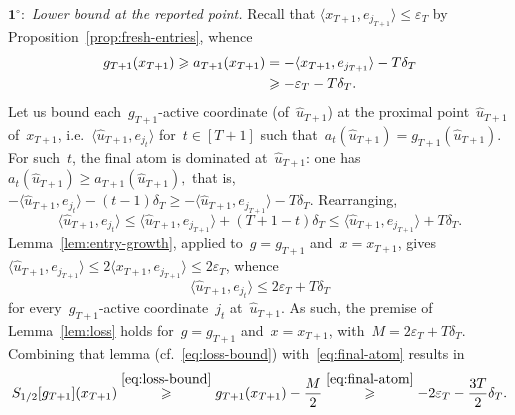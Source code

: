 \documentclass[11pt]{article}
\numberwithin{equation}{section}
\let\le\leqslant
\let\ge\geqslant
\theoremstyle{remark}
\newcommand{\proofstep}[1]{$\textbf{#1}^{\circ}$}
\newcommand{\veps}{\varepsilon}
\newcommand{\Env}{S}
\newcommand{\1}{\mathbf{1}}
\begin{document}
\proofstep{1}:~{\em Lower bound at the reported point.} 
Recall that
$
\langle x_{T+1}, e_{j_{T+1}} \rangle \le \veps_T
$
by Proposition~\ref{prop:fresh-entries}, whence 
\begin{align}
\label{eq:final-atom}
	g_{T+1}(x_{T+1})
	\ge a_{T+1}(x_{T+1})
	&= 
	-\langle x_{T+1}, e_{j_{T+1}} \rangle - T\delta_T \notag\\
	&\ge
	-\veps_T - T\delta_T.
\end{align}
Let us bound each~$g_{T+1}$-{active coordinate} (of~$\hat u_{T+1}$) at the proximal point~$\hat u_{T+1}$ of~$x_{T+1}$, i.e.~$\langle \hat u_{T+1}, e_{j_t} \rangle$ for~$t \in [T+1]$ such that~$a_t(\hat u_{T+1}) = g_{T+1}(\hat u_{T+1})$. 
For such~$t$, the final atom is dominated at~$\hat u_{T+1}$: one has
$
a_t(\hat u_{T+1}) \ge a_{T+1}(\hat u_{T+1}),
$
that is,~$- \langle \hat u_{T+1}, e_{j_t} \rangle -(t-1)\delta_T \ge -\langle \hat u_{T+1}, e_{j_{T+1}} \rangle -T\delta_T$. 
Rearranging,
\begin{equation*}
        \langle \hat u_{T+1}, e_{j_t} \rangle 
        \le \langle \hat u_{T+1}, e_{j_{T+1}} \rangle + (T+1-t)\delta_T 
        \le \langle \hat u_{T+1}, e_{j_{T+1}} \rangle + T\delta_T.
\end{equation*}
Lemma~\ref{lem:entry-growth}, applied to~$g = g_{T+1}$ and~$x = x_{T+1}$, gives~$\langle \hat u_{T+1}, e_{j_{T+1}} \rangle \le 2 \langle x_{T+1}, e_{j_{T+1}} \rangle \le 2\veps_T$, whence
\begin{equation*}
        \langle \hat u_{T+1}, e_{j_t} \rangle  \le 2\veps_T + T\delta_T
\end{equation*}
for every~$g_{T+1}$-active coordinate~$j_t$ at~$\hat u_{T+1}$. 
As such, the premise of Lemma~\ref{lem:loss} holds for~$g = g_{T+1}$ and~$x = x_{T+1}$, with~$M = 2\veps_T + T\delta_T$.
Combining that lemma (cf.~\eqref{eq:loss-bound}) with~\eqref{eq:final-atom} results in
\begin{equation}
\label{eq:env-lower}
\begin{aligned}
\Env_{1/2}[g_{T+1}](x_{T+1})
        \stackrel{\eqref{eq:loss-bound}}{\ge}
g_{T+1}(x_{T+1}) - \frac{M}{2}
        \stackrel{\eqref{eq:final-atom}}{\ge}
         -2\veps_T - \frac{3T}{2} \delta_T.
\end{aligned}
\end{equation}
\end{document}

